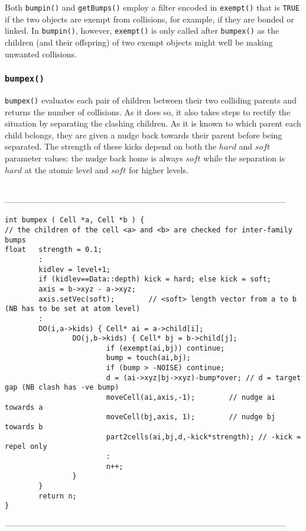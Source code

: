 Both {\tt bumpin()} and {\tt getBumps()} employ a filter encoded in {\tt exempt()} that is
{\tt TRUE} if the two objects are exempt from collisions, for example, if they are bonded or linked.
In  {\tt bumpin()}, however, {\tt exempt()} is only called after  {\tt bumpex()} as the children
(and their offspring) of two exempt objects might well be making unwanted collisions.

\subsubsection{{\tt bumpex()}}

{\tt bumpex()} evaluates each pair of children between their two colliding parents
and returns the number of collisions.  As it does so, it also takes steps to rectify the
situation by separating the clashing children.  As it is known to which parent each child belongs,
they are given a nudge back towards their parent before being separated. 
The strength of these kicks depend on both the $hard$ and $soft$ parameter values:
the nudge back home is always $soft$ while the separation is $hard$ at the atomic level
and $soft$ for higher levels.
\begin{singlespace}
\ \\
------------------------------------------------------------------------------------------------------
\begin{tiny}
\begin{verbatim}
int bumpex ( Cell *a, Cell *b ) {
// the children of the cell <a> and <b> are checked for inter-family bumps
float   strength = 0.1;
        :
        kidlev = level+1;
        if (kidlev==Data::depth) kick = hard; else kick = soft;
        axis = b->xyz - a->xyz;
        axis.setVec(soft);        // <soft> length vector from a to b (NB has to be set at atom level)
        :
        DO(i,a->kids) { Cell* ai = a->child[i];
                DO(j,b->kids) { Cell* bj = b->child[j];
                        if (exempt(ai,bj)) continue;
                        bump = touch(ai,bj);
                        if (bump > -NOISE) continue;
                        d = (ai->xyz|bj->xyz)-bump*over; // d = target gap (NB clash has -ve bump)
                        moveCell(ai,axis,-1);        // nudge ai towards a
                        moveCell(bj,axis, 1);        // nudge bj towards b
                        part2cells(ai,bj,d,-kick*strength); // -kick = repel only
                        :
                        n++;
                }
        }
        return n;
}
\end{verbatim}
\end{tiny}
------------------------------------------------------------------------------------------------------
\end{singlespace}

